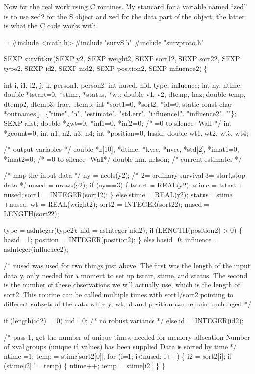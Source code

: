 \documentclass{article}
\begin{document}
Now for the real work using C routines. 
My standard for a variable named ``zed'' is to use zed2 for the S object
and zed for the data part of the object; the latter is what the C code
works with.
\begin{nwchunk}
=
 #include <math.h>
 #include "survS.h"
 #include "survproto.h"
 
 SEXP survfitkm(SEXP y2, SEXP weight2,  SEXP sort12, SEXP sort22, 
                SEXP type2, SEXP id2, SEXP nid2,   SEXP position2,
                SEXP influence2) \{
               
     int i, i1, i2, j, k, person1, person2;
     int nused, nid, type, influence;
     int ny, ntime;
     double *tstart=0, *stime, *status, *wt;
     double v1, v2, dtemp, haz;
     double temp, dtemp2, dtemp3, frac, btemp;
     int *sort1=0, *sort2, *id=0;
     static const char *outnames[]=\{"time", "n", "estimate", "std.err",
                                      "influence1", "influence2", ""\};
     SEXP rlist;
     double *gwt=0, *inf1=0, *inf2=0;  /* =0 to silence -Wall */
     int *gcount=0;
     int n1, n2, n3, n4;
     int *position=0, hasid;
     double wt1, wt2, wt3, wt4;
                       
     /* output variables */
     double  *n[10],  *dtime,
             *kvec, *nvec, *std[2], *imat1=0, *imat2=0; /* =0 to silence -Wall*/
     double km, nelson;  /* current estimates */
 
     /* map the input data */
     ny = ncols(y2);     /* 2= ordinary survival 3= start,stop data */
     nused = nrows(y2);
     if (ny==3) \{ 
         tstart = REAL(y2);
         stime = tstart + nused;
         sort1 = INTEGER(sort12);
     \}
     else stime = REAL(y2);
     status= stime +nused;
     wt = REAL(weight2);
     sort2 = INTEGER(sort22);
     nused = LENGTH(sort22);
                    
     type = asInteger(type2);
     nid = asInteger(nid2);
     if (LENGTH(position2) > 0) \{
         hasid =1;
         position = INTEGER(position2);
     \} else hasid=0;
     influence = asInteger(influence2);
 
     /* nused was used for two things just above.  The first was the length of
        the input data y, only needed for a moment to set up tstart, stime, and
        status.  The second is the number of these observations we will actually
        use, which is the length of sort2.  This routine can be called multiple
        times with sort1/sort2 pointing to different subsets of the data while
        y, wt, id and position can remain unchanged
     */
 
     if (length(id2)==0) nid =0;  /* no robust variance */
     else id = INTEGER(id2);
 
     /* pass 1, get the number of unique times, needed for memory allocation 
       Number of xval groups (unique id values) has been supplied 
       Data is sorted by time
     */
     ntime =1; 
     temp = stime[sort2[0]];
     for (i=1; i<nused; i++) \{
         i2 = sort2[i];
         if (stime[i2] != temp) \{
             ntime++;
             temp = stime[i2];
         \}
     \}        
\end{nwchunk}
\end{document}
